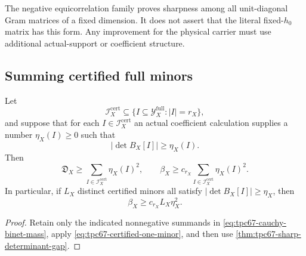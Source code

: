 \begin{remark}
\label{rem:tpc67-determinant-sharpness-scope}
The negative equicorrelation family proves sharpness among all
unit-diagonal Gram matrices of a fixed dimension.  It does not assert
that the literal fixed-\(h_0\) matrix has this form.  Any improvement for
the physical carrier must use additional actual-support or coefficient
structure.
\end{remark}

\subsection{Summing certified full minors}

\begin{corollary}
\label{cor:tpc67-certified-minor-sum}
Let
\[
 \mathscr I_X^{\mathrm{cert}}
 \subseteq
 \{I\subseteq\mathcal Y_X^{\mathrm{full}}:|I|=r_X\},
\]
and suppose that for each \(I\in\mathscr I_X^{\mathrm{cert}}\) an actual
coefficient calculation supplies a number \(\eta_X(I)\ge0\) such that
\begin{equation}
 |\det B_X[I]|\ge\eta_X(I).
 \label{eq:tpc67-certified-one-minor}
\end{equation}
Then
\begin{equation}
 \boxed{\qquad
 \mathfrak D_X
 \ge
 \sum_{I\in\mathscr I_X^{\mathrm{cert}}}\eta_X(I)^2,
 \qquad
 \beta_X
 \ge
 c_{r_X}
 \sum_{I\in\mathscr I_X^{\mathrm{cert}}}\eta_X(I)^2.
 \qquad}
 \label{eq:tpc67-certified-minor-mass}
\end{equation}
In particular, if \(L_X\) distinct certified minors all satisfy
\(|\det B_X[I]|\ge\eta_X\), then
\begin{equation}
 \beta_X\ge c_{r_X}L_X\eta_X^2.
 \label{eq:tpc67-uniform-certified-minors}
\end{equation}
\end{corollary}

\begin{proof}
Retain only the indicated nonnegative summands in
\eqref{eq:tpc67-cauchy-binet-mass}, apply
\eqref{eq:tpc67-certified-one-minor}, and then use
\cref{thm:tpc67-sharp-determinant-gap}.
\end{proof}

